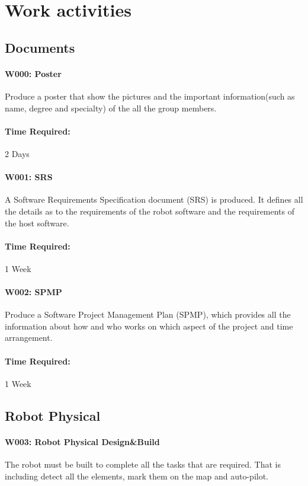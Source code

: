 \documentclass[11pt, a4paper]{report}
\begin{document}
\section{Work activities}



\subsection{Documents}

\paragraph{W000: Poster}
Produce a poster that show the pictures and the important information(such as name, degree and  specialty) of the all the group members.
\paragraph{Time Required:}2 Days\\


\paragraph{W001: SRS}
A Software Requirements Specification document (SRS) is produced. It defines all the details as to the requirements of the robot software and the requirements of the host software.
\paragraph{Time Required:}1 Week\\


\paragraph{W002: SPMP}
Produce a Software Project Management Plan (SPMP), which provides all the information about how and who works on which aspect of the project and time arrangement. 
\paragraph{Time Required:}1 Week\\



\subsection{Robot Physical}
\paragraph{W003: Robot Physical Design\&Build}
The robot must be built to complete all the tasks that are required. That is including detect all the elements, mark them on the map and auto-pilot.
\end{document}
